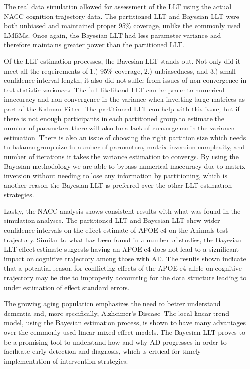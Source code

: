 \documentclass[
]{article}
\begin{document}
The real data simulation allowed for assessment of the LLT using the actual NACC cognition trajectory data. The partitioned LLT and Bayesian LLT were both unbiased and maintained proper 95\% coverage, unlike the commonly used LMEMs. Once again, the Bayesian LLT had less parameter variance and therefore maintains greater power than the partitioned LLT.

Of the LLT estimation processes, the Bayesian LLT stands out. Not only did it meet all the requirements of 1.) 95\% coverage, 2.) unbiasedness, and 3.) small confidence interval length, it also did not suffer from issues of non-convergence in test statistic variances. The full likelihood LLT can be prone to numerical inaccuracy and non-convergence in the variance when inverting large matrices as part of the Kalman Filter. The partitioned LLT can help with this issue, but if there is not enough participants in each partitioned group to estimate the number of parameters there will also be a lack of convergence in the variance estimation. There is also an issue of choosing the right partition size which needs to balance group size to number of parameters, matrix inversion complexity, and number of iterations it takes the variance estimation to converge. By using the Bayesian methodology we are able to bypass numerical inaccuracy due to matrix inversion without needing to lose any information by partitioning, which is another reason the Bayesian LLT is preferred over the other LLT estimation strategies.

Lastly, the NACC analysis shows consistent results with what was found in the simulation analyses. The partitioned LLT and Bayesian LLT show wider confidence intervals on the effect estimate of APOE e4 on the Animals test trajectory. Similar to what has been found in a number of studies, the Bayesian LLT effect estimate suggests having an APOE e4 does not lead to a significant impact on cognitive trajectory among those with AD. The results shown indicate that a potential reason for conflicting effects of the APOE e4 allele on cognitive trajectory may be due to improperly accounting for the data structure leading to under estimation of effect standard errors.

The growing aging population emphasizes the need to better understand dementia and, more specifically, Alzheimer's Disease. The local linear trend model, using the Bayesian estimation process, is shown to have many advantages over the commonly used linear mixed effect models. The Bayesian LLT proves to be a promising tool to understand how and why AD progresses in order to facilitate early detection and diagnosis, which is critical for timely implementation of intervention strategies.
\end{document}
